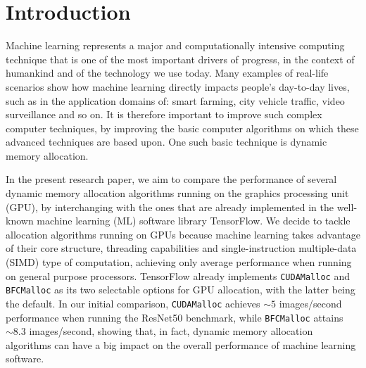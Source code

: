 \documentclass[12pt,twoside]{article}
\begin{document}

\section{Introduction}
\label{sect:introduction}



Machine learning represents a major and computationally intensive computing technique that is one of the most important drivers of progress, in the context of humankind and of the technology we use today. Many examples of real-life scenarios show how machine learning directly impacts people's day-to-day lives, such as in the application domains of: smart farming\todo[inline]{[1 TODO]}, city vehicle traffic\todo[inline]{[2 TODO]}, video surveillance and so on. It is therefore important to improve such complex computer techniques, by improving the basic computer algorithms on which these advanced techniques are based upon. One such basic technique is dynamic memory allocation.

In the present research paper, we aim to compare the performance of several dynamic memory allocation algorithms running on the graphics processing unit (GPU), by interchanging with the ones that are already implemented in the well-known machine learning (ML) software library TensorFlow. We decide to tackle allocation algorithms running on GPUs because machine learning takes advantage of their core structure, threading capabilities and single-instruction multiple-data (SIMD) type of computation, achieving only average performance when running on general purpose processors. TensorFlow already implements \texttt{CUDAMalloc} and \texttt{BFCMalloc} as its two selectable options for GPU allocation, with the latter being the default. In our initial comparison, \texttt{CUDAMalloc} achieves ${\sim}5$ images/second performance when running the ResNet50 benchmark, while \texttt{BFCMalloc} attains ${\sim}8.3$ images/second, showing that, in fact, dynamic memory allocation algorithms can have a big impact on the overall performance of machine learning software.
\end{document}

